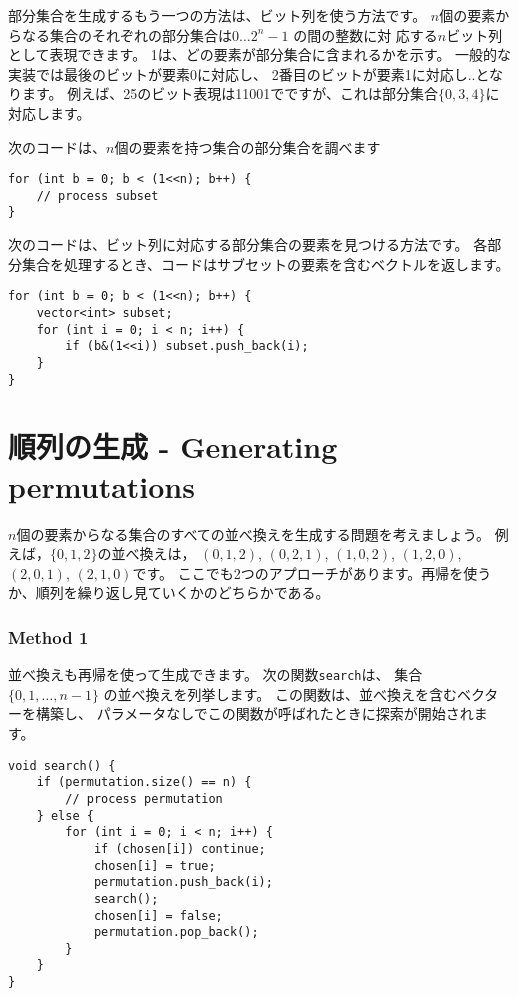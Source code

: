部分集合を生成するもう一つの方法は、ビット列を使う方法です。
$n$個の要素からなる集合のそれぞれの部分集合は$0 \ldots 2^n-1$
の間の整数に対 応する$n$ビット列として表現できます。
1は、どの要素が部分集合に含まれるかを示す。
一般的な実装では最後のビットが要素0に対応し、
2番目のビットが要素1に対応し..となります。
例えば、25のビット表現は11001でですが、これは部分集合$\{0,3,4\}$に対応します。

次のコードは、$n$個の要素を持つ集合の部分集合を調べます

\begin{lstlisting}
for (int b = 0; b < (1<<n); b++) {
    // process subset
}
\end{lstlisting}

次のコードは、ビット列に対応する部分集合の要素を見つける方法です。
各部分集合を処理するとき、コードはサブセットの要素を含むベクトルを返します。

\begin{lstlisting}
for (int b = 0; b < (1<<n); b++) {
    vector<int> subset;
    for (int i = 0; i < n; i++) {
        if (b&(1<<i)) subset.push_back(i);
    }
}
\end{lstlisting}

\section{順列の生成 - Generating permutations}


$n$個の要素からなる集合のすべての並べ換えを生成する問題を考えましょう。
例えば，$\{0,1,2\}$の並べ換えは，
$(0,1,2)$, $(0,2,1)$, $(1,0,2)$, $(1,2,0)$,
$(2,0,1)$, $(2,1,0)$です。
ここでも2つのアプローチがあります。再帰を使うか、順列を繰り返し見ていくかのどちらかである。

\subsubsection{Method 1}

並べ換えも再帰を使って生成できます。
次の関数\texttt{search}は、
集合  $\{0,1,\ldots,n-1\}$ の並べ換えを列挙します。
この関数は、並べ換えを含むベクターを構築し、
パラメータなしでこの関数が呼ばれたときに探索が開始されます。

\begin{lstlisting}
void search() {
    if (permutation.size() == n) {
        // process permutation
    } else {
        for (int i = 0; i < n; i++) {
            if (chosen[i]) continue;
            chosen[i] = true;
            permutation.push_back(i);
            search();
            chosen[i] = false;
            permutation.pop_back();
        }
    }
}
\end{lstlisting}

